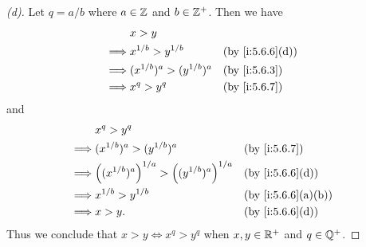 \begin{proof}[(d)]
  Let \(q = a / b\) where \(a \in \mathbb{Z}\) and \(b \in \mathbb{Z}^+\).
  Then we have
  \begin{align*}
             & x > y                                              \\
    \implies & x^{1 / b} > y^{1 / b}         &  & \by{i:5.6.6}[d] \\
    \implies & (x^{1 / b})^a > (y^{1 / b})^a &  & \by{i:5.6.3}    \\
    \implies & x^q > y^q                     &  & \by{i:5.6.7}
  \end{align*}
  and
  \begin{align*}
             & x^q > y^q                                                                      \\
    \implies & (x^{1 / b})^a > (y^{1 / b})^a                           &  & \by{i:5.6.7}      \\
    \implies & \pa{(x^{1 / b})^a}^{1 / a} > \pa{(y^{1 / b})^a}^{1 / a} &  & \by{i:5.6.6}[d]   \\
    \implies & x^{1 / b} > y^{1 / b}                                   &  & \by{i:5.6.6}[a,b] \\
    \implies & x > y.                                                  &  & \by{i:5.6.6}[d]
  \end{align*}
  Thus we conclude that \(x > y \iff x^q > y^q\) when \(x, y \in \mathbb{R}^+\) and \(q \in \mathbb{Q}^+\).
\end{proof}

